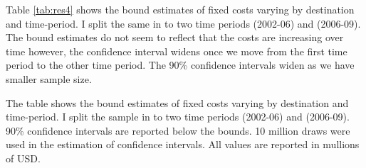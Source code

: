 \documentclass[11pt, letterpaper]{article} \usepackage{amsmath}
\newcommand{\floatintro}[1]{
  
  \vspace*{0.1in}
  
  {\footnotesize

    #1
    
  }
  
  \vspace*{0.1in} } \newcommand{\Hline}{\noindent\rule{18cm}{0.5pt}}
\begin{document}
Table \ref{tab:res4} shows the bound estimates of fixed costs varying
by destination and time-period. I split the same in to two time
periods (2002-06) and (2006-09). The bound estimates do not seem to
reflect that the costs are increasing over time however, the
confidence interval widens once we move from the first time period to
the other time period. The 90\% confidence intervals widen as we have
smaller sample size.
\begin{table}[htbp!]
  \floatintro{The table shows the bound estimates of fixed costs
    varying by destination and time-period. I split the sample in to
    two time periods (2002-06) and (2006-09). 90\% confidence
    intervals are reported below the bounds. 10 million draws were
    used in the estimation of confidence intervals. All values are
    reported in mullions of USD.}
  \centering
  \caption{Bound estimates of fixed costs varying by destination and
    time periods (in million USD)}
  \label{tab:res4}
\end{table}
\end{document}
